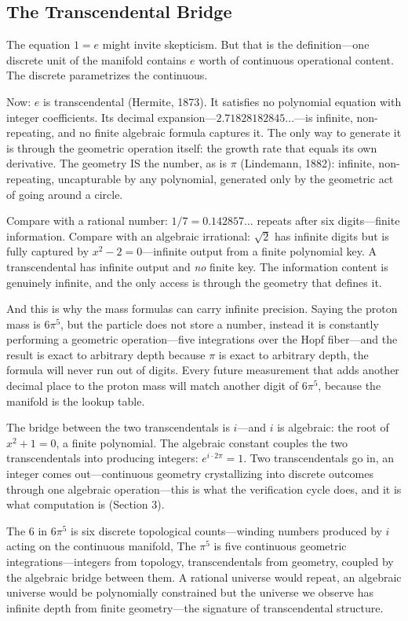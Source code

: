 \documentclass[12pt]{article}
\begin{document}
\subsection{The Transcendental Bridge}

The equation $1 = e$ might invite skepticism. But that is the definition---one discrete unit of the manifold contains $e$ worth of continuous operational content. The discrete parametrizes the continuous.

Now: $e$ is transcendental (Hermite, 1873). It satisfies no polynomial equation with integer coefficients. Its decimal expansion---$2.71828182845\ldots$---is infinite, non-repeating, and no finite algebraic formula captures it. The only way to generate it is through the geometric operation itself: the growth rate that equals its own derivative. The geometry IS the number, as is $\pi$ (Lindemann, 1882): infinite, non-repeating, uncapturable by any polynomial, generated only by the geometric act of going around a circle.

Compare with a rational number: $1/7 = 0.142857\ldots$ repeats after six digits---finite information. Compare with an algebraic irrational: $\sqrt{2}$ has infinite digits but is fully captured by $x^2 - 2 = 0$---infinite output from a finite polynomial key. A transcendental has infinite output and \textit{no} finite key. The information content is genuinely infinite, and the only access is through the geometry that defines it.

And this is why the mass formulas can carry infinite precision. Saying the proton mass is $6\pi^5$, but the particle does not store a number, instead it is constantly performing a geometric operation---five integrations over the Hopf fiber---and the result is exact to arbitrary depth because $\pi$ is exact to arbitrary depth, the formula will never run out of digits. Every future measurement that adds another decimal place to the proton mass will match another digit of $6\pi^5$, because the manifold is the lookup table.

The bridge between the two transcendentals is $i$---and $i$ is algebraic: the root of $x^2 + 1 = 0$, a finite polynomial. The algebraic constant couples the two transcendentals into producing integers: $e^{i \cdot 2\pi} = 1$. Two transcendentals go in, an integer comes out---continuous geometry crystallizing into discrete outcomes through one algebraic operation---this is what the verification cycle does, and it is what computation is (Section 3).

The 6 in $6\pi^5$ is six discrete topological counts---winding numbers produced by $i$ acting on the continuous manifold, The $\pi^5$ is five continuous geometric integrations---integers from topology, transcendentals from geometry, coupled by the algebraic bridge between them. A rational universe would repeat, an algebraic universe would be polynomially constrained but the universe we observe has infinite depth from finite geometry---the signature of transcendental structure.
\end{document}
